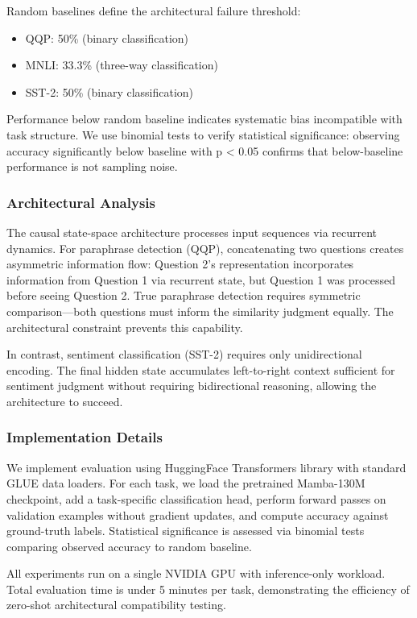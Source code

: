 Random baselines define the architectural failure threshold:
\begin{itemize}
\item QQP: 50\% (binary classification)
\item MNLI: 33.3\% (three-way classification)
\item SST-2: 50\% (binary classification)
\end{itemize}

Performance below random baseline indicates systematic bias incompatible with task structure. We use binomial tests to verify statistical significance: observing accuracy significantly below baseline with p < 0.05 confirms that below-baseline performance is not sampling noise.

\subsubsection{Architectural Analysis}

The causal state-space architecture processes input sequences via recurrent dynamics. For paraphrase detection (QQP), concatenating two questions creates asymmetric information flow: Question 2's representation incorporates information from Question 1 via recurrent state, but Question 1 was processed before seeing Question 2. True paraphrase detection requires symmetric comparison---both questions must inform the similarity judgment equally. The architectural constraint prevents this capability.

In contrast, sentiment classification (SST-2) requires only unidirectional encoding. The final hidden state accumulates left-to-right context sufficient for sentiment judgment without requiring bidirectional reasoning, allowing the architecture to succeed.

\subsubsection{Implementation Details}

We implement evaluation using HuggingFace Transformers library with standard GLUE data loaders. For each task, we load the pretrained Mamba-130M checkpoint, add a task-specific classification head, perform forward passes on validation examples without gradient updates, and compute accuracy against ground-truth labels. Statistical significance is assessed via binomial tests comparing observed accuracy to random baseline.

All experiments run on a single NVIDIA GPU with inference-only workload. Total evaluation time is under 5 minutes per task, demonstrating the efficiency of zero-shot architectural compatibility testing.

